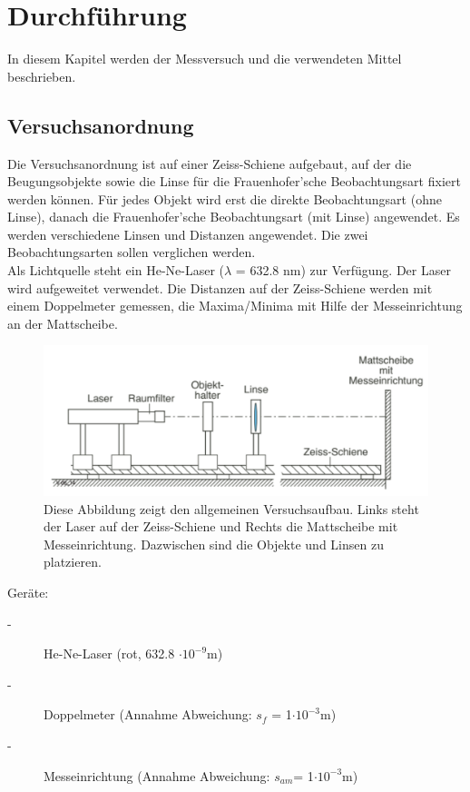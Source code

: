 \chapter{Durchführung}
\thispagestyle{fancy}
In diesem Kapitel werden der Messversuch und die verwendeten Mittel beschrieben.
\section{Versuchsanordnung}
Die Versuchsanordnung ist auf einer Zeiss-Schiene aufgebaut, auf der die Beugungsobjekte sowie die Linse für die Frauenhofer’sche Beobachtungsart fixiert werden können. Für jedes Objekt wird erst die direkte Beobachtungsart (ohne Linse), danach die Frauenhofer’sche Beobachtungsart (mit Linse) angewendet. Es werden verschiedene Linsen und Distanzen angewendet. Die zwei Beobachtungsarten sollen verglichen werden.\\[0.5cm]Als Lichtquelle steht ein He-Ne-Laser ($\lambda$ = 632.8 nm) zur Verfügung. Der Laser wird aufgeweitet verwendet. Die Distanzen auf der Zeiss-Schiene werden mit einem Doppelmeter gemessen, die Maxima/Minima mit Hilfe der Messeinrichtung an der Mattscheibe.\\
\begin{figure}[h]
\begin{center}
\includegraphics[width=\textwidth]{Bilder/Versuchsaufbau.png}
\end{center}
\caption[Versuchsaufbau]{Diese Abbildung zeigt den allgemeinen Versuchsaufbau. Links steht der Laser auf der Zeiss-Schiene und Rechts die Mattscheibe mit Messeinrichtung. Dazwischen sind die Objekte und Linsen zu platzieren\cite{TechnikFHNW2014}.}
\label{fig:Versuchsaufbau}
\end{figure}

\noindent
Geräte:
\begin{description}
\item[-]
He-Ne-Laser (rot, 632.8 $\cdot10^{-9}$m)
\item[-]
Doppelmeter (Annahme Abweichung: $s_{f}$ = 1$\cdot10^{-3}$m)
\item[-]
Messeinrichtung (Annahme Abweichung: $s_{a{m}}$= 1$\cdot10^{-3}$m)
\end{description}
